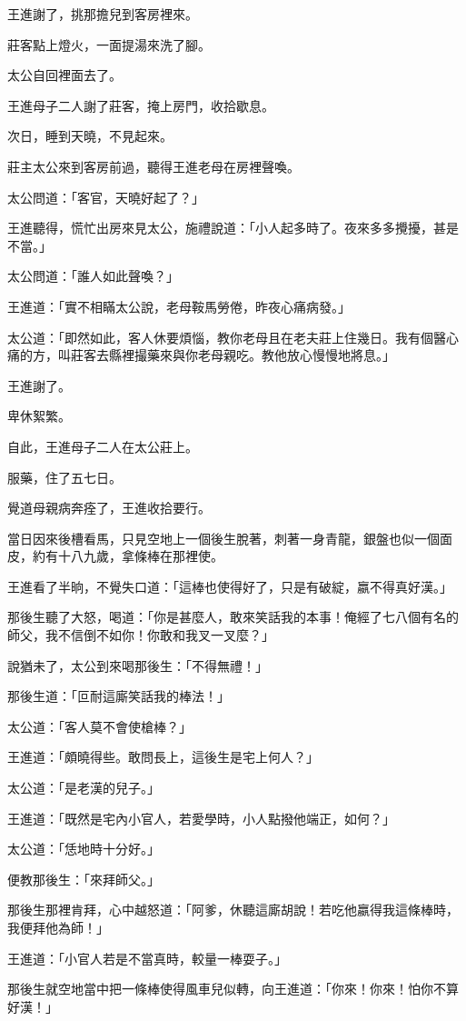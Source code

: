 \documentclass[11pt,a4paper]{article}
\begin{document}
王進謝了，挑那擔兒到客房裡來。

莊客點上燈火，一面提湯來洗了腳。

太公自回裡面去了。

王進母子二人謝了莊客，掩上房門，收拾歇息。

次日，睡到天曉，不見起來。

莊主太公來到客房前過，聽得王進老母在房裡聲喚。

太公問道：「客官，天曉好起了？」

王進聽得，慌忙出房來見太公，施禮說道：「小人起多時了。夜來多多攪擾，甚是不當。」

太公問道：「誰人如此聲喚？」

王進道：「實不相瞞太公說，老母鞍馬勞倦，昨夜心痛病發。」

太公道：「即然如此，客人休要煩惱，教你老母且在老夫莊上住幾日。我有個醫心痛的方，叫莊客去縣裡撮藥來與你老母親吃。教他放心慢慢地將息。」

王進謝了。

卑休絮繁。

自此，王進母子二人在太公莊上。

服藥，住了五七日。

覺道母親病奔痊了，王進收拾要行。

當日因來後槽看馬，只見空地上一個後生脫著，刺著一身青龍，銀盤也似一個面皮，約有十八九歲，拿條棒在那裡使。

王進看了半晌，不覺失口道：「這棒也使得好了，只是有破綻，嬴不得真好漢。」

那後生聽了大怒，喝道：「你是甚麼人，敢來笑話我的本事！俺經了七八個有名的師父，我不信倒不如你！你敢和我叉一叉麼？」

說猶未了，太公到來喝那後生：「不得無禮！」

那後生道：「叵耐這廝笑話我的棒法！」

太公道：「客人莫不會使槍棒？」

王進道：「頗曉得些。敢問長上，這後生是宅上何人？」

太公道：「是老漢的兒子。」

王進道：「既然是宅內小官人，若愛學時，小人點撥他端正，如何？」

太公道：「恁地時十分好。」

便教那後生：「來拜師父。」

那後生那裡肯拜，心中越怒道：「阿爹，休聽這廝胡說！若吃他嬴得我這條棒時，我便拜他為師！」

王進道：「小官人若是不當真時，較量一棒耍子。」

那後生就空地當中把一條棒使得風車兒似轉，向王進道：「你來！你來！怕你不算好漢！」
\end{document}
